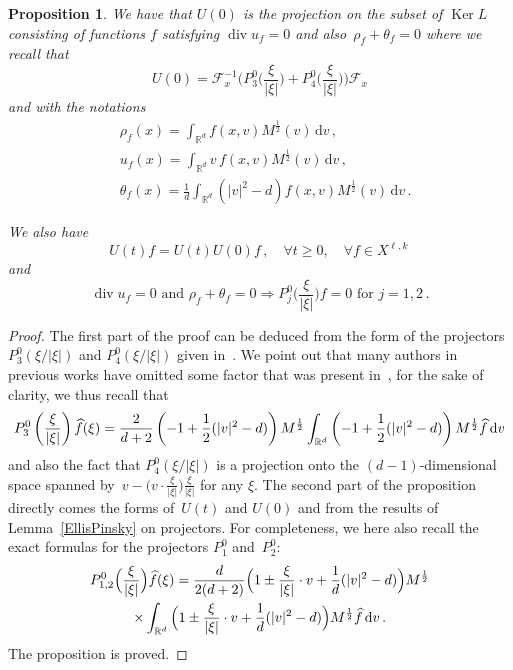 \documentclass[11pt]{article}
\newtheorem{prop}[theo]{Proposition}
\theoremstyle{definition}
\numberwithin{equation}{section}
\numberwithin{figure}{section}
\numberwithin{table}{section}
\newcommand*{\dd}{\mathrm{d}}
\newcommand*{\dv}{\dd v}
\newcommand*\R {\mathbb{R}}
\newcommand{\Div}{\operatorname{div}}
\let\oldforall\forall
\renewcommand*{\forall}{\mathrel{\oldforall}}
\let\oldhat\hat
\renewcommand*{\hat}[1]{\mathchoice{\widehat{#1}}{\widehat{#1}}{\oldhat{#1}}{\oldhat{#1}}}
\begin{document}
\begin{prop}
We have that $U(0)$ is the projection on the subset of $\operatorname{Ker} L$ consisting of functions $f$ satisfying $\Div u_f = 0$ and also~$\rho_f+ \theta_f = 0$ where we recall that
\begin{equation}\label{formulaU(0}
U(0) =\mathcal{F}_x^{-1} \bigg(P_{3}^0\Big(\frac{\xi}{|\xi|}\Big) + P_{4}^0\Big(\frac{\xi}{|\xi|}\Big)\bigg) \mathcal{F}_x
\end{equation}
and with the notations
\begin{align*}
&\rho_{f}(x)= \int_{\R^d} f (x,v)M^\frac12 (v) \, \dv \,,\\
&u_{f} (x)= \int_{\R^d} v\, f (x,v)M^\frac12 (v) \, \dv\,, \\
&\theta_{f} (x)= \frac{1}{d} \int_{\R^d} (|v|^2-d) f (x,v)M^\frac12 (v) \, \dv \,.
\end{align*}

We also have
\begin{equation}\label{U(t)U(0}
U(t) f = U(t) U(0) f \,, \quad \forall t \ge 0, \quad \forall f \in X^{\ell,k} \,
\end{equation}
and
\begin{equation}\label{P012}
\Div u_f = 0 \text{ and } \rho_f+ \theta_f = 0 \Rightarrow P_{j}^0\Big(\frac{\xi}{|\xi|}\Big) f =0 \text{ for } j=1,2 \,.
\end{equation}
\end{prop}

\begin{proof}
The first part of the proof can be deduced from the form of the projectors~$P_3^0(\xi/|\xi|)$ and $P_4^0(\xi/|\xi|)$ given in~\cite{Ellis-Pinsky}. We point out that many authors in previous works have omitted some factor that was present in~\cite{Ellis-Pinsky}, for the sake of clarity, we thus recall that
\[
P_{3}^0\left(\frac{\xi}{|\xi|}\right) \hat f (\xi) = \frac{2}{d+2} \left(-1+ \frac 12 (|v|^2-d)\right) M^\frac12 \int_{\R^d} \left(-1+ \frac 12 (|v|^2-d)\right) M^{\frac12} \hat f \, \dv
\]
and also the fact that $P_4^0(\xi/|\xi|)$ is a projection onto the $(d-1)$-dimensional space spanned by~$v-\big(v \cdot \frac{\xi}{|\xi|}\big) \frac{\xi}{|\xi|}$ for any $\xi$. The second part of the proposition directly comes the forms of~$U(t)$ and $U(0)$ and from the results of Lemma~\ref{EllisPinsky} on projectors. For completeness, we here also recall the exact formulas for the projectors $P_1^0$ and~$P^0_2$:%
\begin{multline*}
P_{1,2}^0\Big(\frac{\xi}{|\xi|}\Big) \hat f (\xi)= \frac{d}{2(d+2)} \Big(1 \pm \frac{\xi}{|\xi|} \cdot v + \frac 1d (|v|^2-d)\Big) M^\frac12 \\
\times\int_{\R^d} \Big(1 \pm \frac{\xi}{|\xi|} \cdot v + \frac 1d (|v|^2-d)\Big) M^{\frac12} \hat f \, \dv \,.
\end{multline*}
%
The proposition is proved.
\end{proof}
\end{document}
